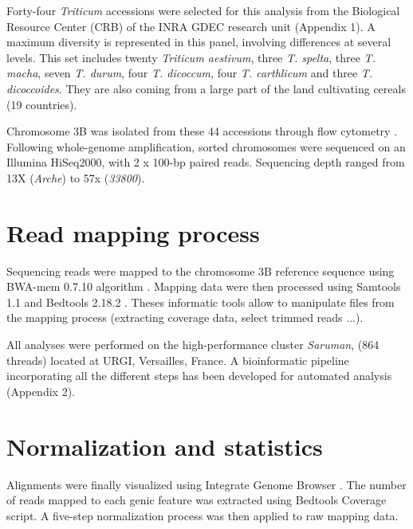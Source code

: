 \documentclass[a4paper, 12pt]{article}
\begin{document}
\begin{onehalfspace}
Forty-four \textit{Triticum} accessions were selected for this analysis from the Biological Resource Center (CRB) of the INRA GDEC research unit (Appendix 1). A maximum diversity is represented in this panel, involving differences at several levels. This set includes twenty \textit{Triticum aestivum}, three \textit{T. spelta}, three \textit{T. macha}, seven \textit{T. durum}, four \textit{T. dicoccum}, four \textit{T. carthlicum} and three \textit{T. dicoccoides}. They are also coming from a large part of the land cultivating cereals (19 countries).

Chromosome 3B was isolated from these 44 accessions through flow cytometry \citep{Dolezel2014}. Following whole-genome amplification, sorted chromosomes were sequenced on an Illumina HiSeq2000, with 2 x 100-bp paired reads. Sequencing depth ranged from 13X (\textit{Arche}) to 57x (\textit{33800}). 

    \section{Read mapping process}
    
Sequencing reads were mapped to the chromosome 3B reference sequence \citep{Choulet2k14} using BWA-mem 0.7.10 algorithm \citep{LiBWA2009}. Mapping data were then processed using Samtools 1.1 \citep{LiSAMTOOLS2009} and Bedtools 2.18.2 \citep{Quinlan2010}. Theses informatic tools allow to manipulate files from the mapping process (extracting coverage data, select trimmed reads ...). 

All analyses were performed on the high-performance cluster \textit{Saruman}, (864 threads) located at URGI, Versailles, France. A bioinformatic pipeline incorporating all the different steps has been developed for automated analysis (Appendix 2).

    \section{Normalization and statistics}
    
Alignments were finally visualized using Integrate Genome Browser \citep{Thorvaldsdottir2013}. The number of reads mapped to each genic feature was extracted using Bedtools Coverage script. A five-step normalization process was then applied to raw mapping data. 

\newpage %
\thispagestyle{empty}
~
\addtocounter{page}{-1}
\newpage
\clearpage %


\end{onehalfspace}
\end{document}
